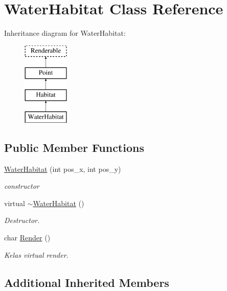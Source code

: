 \hypertarget{class_water_habitat}{}\section{Water\+Habitat Class Reference}
\label{class_water_habitat}
Inheritance diagram for Water\+Habitat\+:\begin{figure}[H]
\begin{center}
\leavevmode
\includegraphics[height=4.000000cm]{class_water_habitat}
\end{center}
\end{figure}
\subsection*{Public Member Functions}
\begin{DoxyCompactItemize}
\item 
\hyperlink{class_water_habitat_a354ae7885842eb37cfcdbd7bef8454a3}{Water\+Habitat} (int pos\+\_\+x, int pos\+\_\+y)
\begin{DoxyCompactList}\small\item\em constructor \end{DoxyCompactList}\item 
virtual \hyperlink{class_water_habitat_abf6341b18b2fe62110998db3ffbde4b7}{$\sim$\+Water\+Habitat} ()\hypertarget{class_water_habitat_abf6341b18b2fe62110998db3ffbde4b7}{}\label{class_water_habitat_abf6341b18b2fe62110998db3ffbde4b7}

\begin{DoxyCompactList}\small\item\em Destructor. \end{DoxyCompactList}\item 
char \hyperlink{class_water_habitat_a014ef4d2a9e5f37ac70a61d3f060b983}{Render} ()
\begin{DoxyCompactList}\small\item\em Kelas virtual render. \end{DoxyCompactList}\end{DoxyCompactItemize}
\subsection*{Additional Inherited Members}


